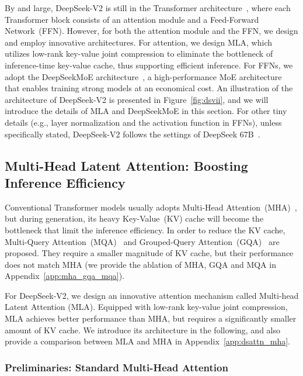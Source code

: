\documentclass[11pt, a4paper, logo, copyright, nonumbering]{deepseek}
\newcommand{\dsvi}{DeepSeek 67B}
\newcommand{\dsvii}{DeepSeek-V2}
\newcommand{\dsattn}{MLA}
\newcommand{\dsmoe}{DeepSeekMoE}
\begin{document}
\begin{CJK*}{UTF8}{gbsn}
By and large, \dsvii{} is still in the Transformer architecture~\citep{transformer}, where each Transformer block consists of an attention module and a Feed-Forward Network~(FFN). 
However, for both the attention module and the FFN, we design and employ innovative architectures. 
For attention, we design \dsattn{}, which utilizes low-rank key-value joint compression to eliminate the bottleneck of inference-time key-value cache, thus supporting efficient inference.
For FFNs, we adopt the \dsmoe{} architecture~\citep{deepseekmoe}, a high-performance MoE architecture that enables training strong models at an economical cost. 
An illustration of the architecture of \dsvii{} is presented in Figure~\ref{fig:dsvii}, and we will introduce the details of \dsattn{} and \dsmoe{} in this section. 
For other tiny details (e.g., layer normalization and the activation function in FFNs), unless specifically stated, \dsvii{} follows the settings of \dsvi{}~\citep{deepseek1}. 

\subsection{Multi-Head Latent Attention: Boosting Inference Efficiency}

Conventional Transformer models usually adopts Multi-Head Attention~(MHA)~\citep{transformer}, but during generation, its heavy Key-Value~(KV) cache will become the bottleneck that limit the inference efficiency. 
In order to reduce the KV cache, Multi-Query Attention~(MQA)~\citep{mqa} and Grouped-Query Attention~(GQA)~\citep{ainslie2023gqa} are proposed. 
They require a smaller magnitude of KV cache, but their performance does not match MHA (we provide the ablation of MHA, GQA and MQA in Appendix~\ref{app:mha_gqa_mqa}).

For \dsvii{}, we design an innovative attention mechanism called Multi-head Latent Attention (\dsattn{}). 
Equipped with low-rank key-value joint compression, \dsattn{} achieves better performance than MHA, but requires a significantly smaller amount of KV cache. 
We introduce its architecture in the following, and also provide a comparison between \dsattn{} and MHA in Appendix~\ref{app:dsattn_mha}. 

\subsubsection{Preliminaries: Standard Multi-Head Attention}


\end{CJK*}
\end{document}
